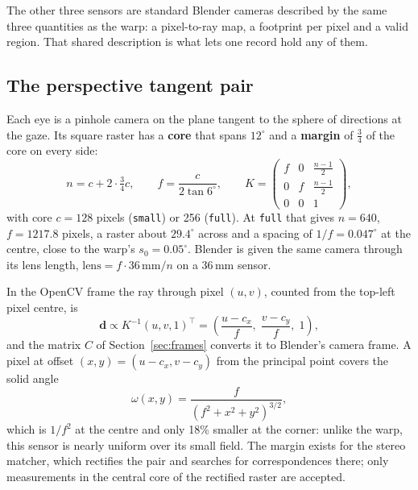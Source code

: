 \documentclass[11pt,a4paper]{article}
\newcommand{\code}[1]{\texttt{\small #1}}
\newcommand{\vb}[1]{\mathbf{#1}}
\begin{document}
The other three sensors are standard Blender cameras described by the same three quantities as the warp: a
pixel-to-ray map, a footprint per pixel and a valid region. That shared description is what lets one record hold
any of them.

\subsection{The perspective tangent pair}\label{sec:persp}

Each eye is a pinhole camera on the plane tangent to the sphere of directions at the gaze. Its square raster has
a \textbf{core} that spans $12^\circ$ and a \textbf{margin} of $\tfrac34$ of the core on every side:
\begin{equation}\label{eq:K}
n = c + 2\cdot\tfrac{3}{4}c, \qquad f = \frac{c}{2\tan 6^\circ}, \qquad
K = \begin{pmatrix} f & 0 & \tfrac{n-1}{2} \\ 0 & f & \tfrac{n-1}{2} \\ 0 & 0 & 1 \end{pmatrix},
\end{equation}
with core $c = 128$ pixels (\code{small}) or 256 (\code{full}). At \code{full} that gives $n = 640$,
$f = 1217.8$ pixels, a raster about $29.4^\circ$ across and a spacing of $1/f = 0.047^\circ$ at the centre, close
to the warp's $s_0 = 0.05^\circ$. Blender is given the same camera through its lens length,
$\text{lens} = f\cdot 36\,\text{mm}/n$ on a 36\,mm sensor.

In the OpenCV frame the ray through pixel $(u,v)$, counted from the top-left pixel centre, is
\begin{equation}\label{eq:ray-persp}
\vb{d} \propto K^{-1}(u, v, 1)^{\top} = \left(\frac{u - c_x}{f},\; \frac{v - c_y}{f},\; 1\right),
\end{equation}
and the matrix $C$ of Section~\ref{sec:frames} converts it to Blender's camera frame. A pixel at offset
$(x,y) = (u - c_x, v - c_y)$ from the principal point covers the solid angle
\begin{equation}\label{eq:omega-persp}
\omega(x, y) = \frac{f}{\left(f^2 + x^2 + y^2\right)^{3/2}},
\end{equation}
which is $1/f^2$ at the centre and only 18\% smaller at the corner: unlike the warp, this sensor is nearly uniform
over its small field. The margin exists for the stereo matcher, which rectifies the pair and searches for
correspondences there; only measurements in the central core of the rectified raster are accepted.
\end{document}
